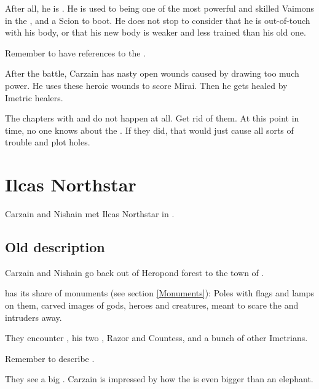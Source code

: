 After all, he is \VaimonCaliph. 
He is used to being one of the most powerful and skilled Vaimons in the \caliphate, and a Scion to boot. 
He does not stop to consider that he is out-of-touch with his body, or that his new body is weaker and less trained than his old one. 

Remember to have references to the . 

After the battle, Carzain has nasty open wounds caused by drawing too much \qliphah{} power. 
He uses these heroic wounds to score Mirai. 
Then he gets healed by Imetric healers. 

The chapters with \ChyrieEsmerel{} and \LocarPsyrex{} do not happen at all. 
Get rid of them. 
At this point in time, no one knows about the \vertex. 
If they did, that would just cause all sorts of trouble and plot holes. 















\section{Ilcas Northstar}
Carzain and Nishain met Ilcas Northstar in \Bryndwin. 









\subsection{Old description}
Carzain and Nishain go back out of Heropond forest to the town of \Bryndwin.

\Bryndwin has its share of monuments (see section \ref{Monuments}): Poles with flags and lamps on them, carved images of gods, heroes and creatures, meant to scare the \Wylde and intruders away.

They encounter , his two \nycans, Razor and Countess, and a bunch of other Imetrians. 

Remember to describe .

They see a big . Carzain is impressed by how the \mulgron is even bigger than an elephant. 

